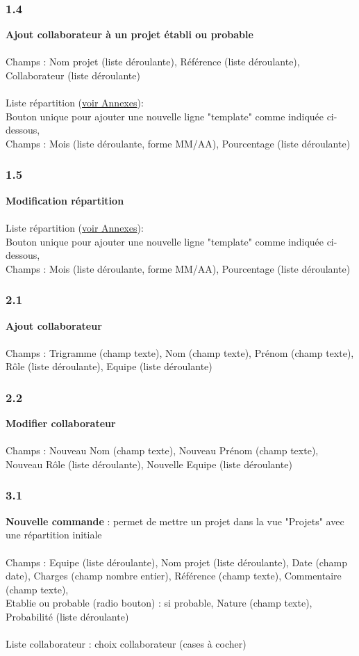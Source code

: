\documentclass[french]{report}
\begin{document}
\subsubsection{1.4}
\label{sec:1.4}
\textbf{Ajout collaborateur à un projet établi ou probable}\\\\
Champs : Nom projet (liste déroulante), Référence (liste déroulante), Collaborateur
(liste déroulante)\\\\
Liste répartition (\hyperref[sec:annexe]{voir Annexes}):\\
Bouton unique pour ajouter une nouvelle ligne "template" comme indiquée ci-dessous,\\
Champs : Mois (liste déroulante, forme MM/AA), Pourcentage (liste déroulante)

\subsubsection{1.5}
\label{sec:1.5}
\textbf{Modification répartition}\\\\
Liste répartition (\hyperref[sec:annexe]{voir Annexes}):\\
Bouton unique pour ajouter une nouvelle ligne "template" comme indiquée ci-dessous,\\
Champs : Mois (liste déroulante, forme MM/AA), Pourcentage (liste déroulante)

\subsubsection{2.1}
\label{sec:2.1}
\textbf{Ajout collaborateur}\\\\ Champs : Trigramme (champ texte), Nom (champ texte),
Prénom (champ texte), Rôle (liste déroulante), Equipe (liste déroulante)

\subsubsection{2.2}
\label{sec:2.2}
\textbf{Modifier collaborateur}\\\\ Champs : Nouveau Nom (champ texte), Nouveau Prénom
(champ texte), Nouveau Rôle (liste déroulante), Nouvelle Equipe (liste déroulante)

\subsubsection{3.1}
\label{sec:3.1}
\textbf{Nouvelle commande} : permet de mettre un projet dans la vue "Projets" avec une
répartition initiale\\\\ Champs : Equipe (liste déroulante), Nom projet (liste
déroulante), Date (champ date), Charges (champ nombre entier), Référence (champ texte),
Commentaire (champ texte),\\Etablie ou probable (radio bouton) : si probable,
Nature (champ texte), Probabilité (liste déroulante)\\\\
Liste collaborateur : choix collaborateur (cases à cocher)
\end{document}
